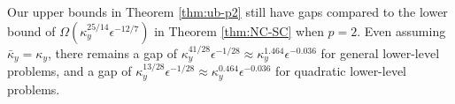 \documentclass{article}
\begin{document}
Our upper bounds in Theorem \ref{thm:ub-p2} still have gaps 
compared to the lower bound of $\Omega(\kappa_y^{25/14} \epsilon^{-12/7})$ in Theorem \ref{thm:NC-SC} when $p=2$. Even assuming $\bar \kappa_y = \kappa_y$, there remains a gap of $\kappa_y^{41/28} \epsilon^{-1/28} \approx \kappa_y^{1.464} \epsilon^{-0.036}$ for general lower-level problems, and a gap of $\kappa_y^{13/28} \epsilon^{-1/28} \approx \kappa_y^{0.464} \epsilon^{-0.036}$ for quadratic lower-level problems. 




 




%
\end{document}
